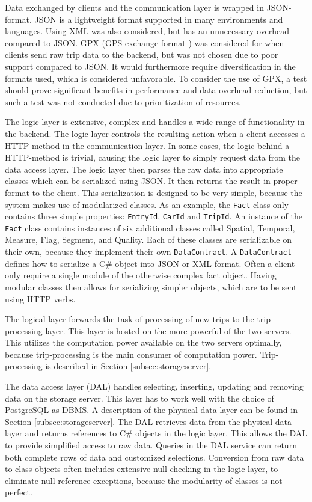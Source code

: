 Data exchanged by clients and the communication layer is wrapped in JSON-format. JSON is a lightweight format supported in many environments and languages. Using XML was also considered, but has an unnecessary overhead compared to JSON. GPX (GPS exchange format \citep{GPX_format}) was considered for when clients send raw trip data to the backend, but was not chosen due to poor support compared to JSON. It would furthermore require diversification in the formats used, which is considered unfavorable. To consider the use of GPX, a test should prove significant benefits in performance and data-overhead reduction, but such a test was not conducted due to prioritization of resources. 

The logic layer is extensive, complex and handles a wide range of functionality in the backend. The logic layer controls the resulting action when a client accesses a HTTP-method in the communication layer. In some cases, the logic behind a HTTP-method is trivial, causing the logic layer to simply request data from the data access layer. The logic layer then parses the raw data into appropriate classes which can be serialized using JSON. It then returns the result in proper format to the client. This serialization is designed to be very simple, because the system makes use of modularized classes. As an example, the \texttt{Fact} class only contains three simple properties: \texttt{EntryId}, \texttt{CarId} and \texttt{TripId}. An instance of the \texttt{Fact} class contains instances of six additional classes called Spatial, Temporal, Measure, Flag, Segment, and Quality. Each of these classes are serializable on their own, because they implement their own \texttt{DataContract}. A \texttt{DataContract} defines how to serialize a C\# object into JSON or XML format. Often a client only require a single module of the otherwise complex fact object. Having modular classes then allows for serializing simpler objects, which are to be sent using HTTP verbs.

The logical layer forwards the task of processing of new trips to the trip-processing layer. This layer is hosted on the more powerful of the two servers. This utilizes the computation power available on the two servers optimally, because trip-processing is the main consumer of computation power. Trip-processing is described in Section \ref{subsec:storageserver}. 

The data access layer (DAL) handles selecting, inserting, updating and removing data on the storage server. This layer has to work well with the choice of PostgreSQL as DBMS. A description of the physical data layer can be found in Section \ref{subsec:storageserver}. The DAL retrieves data from the physical data layer and returns references to C\# objects in the logic layer. This allows the DAL to provide simplified access to raw data. Queries in the DAL service can return both complete rows of data and customized selections. Conversion from raw data to class objects often includes extensive null checking in the logic layer, to eliminate null-reference exceptions, because the modularity of classes is not perfect. 